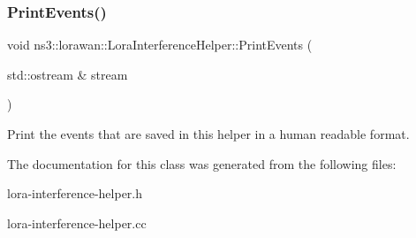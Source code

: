 \subsubsection{\texorpdfstring{Print\+Events()}{PrintEvents()}}
{\footnotesize\ttfamily void ns3\+::lorawan\+::\+Lora\+Interference\+Helper\+::\+Print\+Events (\begin{DoxyParamCaption}\item[{std\+::ostream \&}]{stream }\end{DoxyParamCaption})}

Print the events that are saved in this helper in a human readable format. 

The documentation for this class was generated from the following files\+:\begin{DoxyCompactItemize}
\item 
lora-\/interference-\/helper.\+h\item 
lora-\/interference-\/helper.\+cc\end{DoxyCompactItemize}
